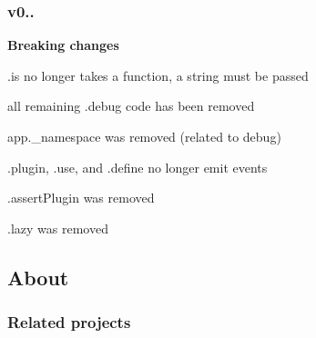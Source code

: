 \subsubsection*{v0..}

{\bfseries Breaking changes}


\begin{DoxyItemize}
\item {\ttfamily .is} no longer takes a function, a string must be passed
\item all remaining {\ttfamily .debug} code has been removed
\item {\ttfamily app.\+\_\+namespace} was removed (related to {\ttfamily debug})
\item {\ttfamily .plugin}, {\ttfamily .use}, and {\ttfamily .define} no longer emit events
\item {\ttfamily .assert\+Plugin} was removed
\item {\ttfamily .lazy} was removed
\end{DoxyItemize}

\subsection*{About}

\subsubsection*{Related projects}


